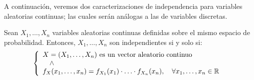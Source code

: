 A continuación, veremos dos caracterizaciones de independencia para variables aleatorias continuas; las cuales serán análogas a las de variables discretas.
\begin{prop}
    Sean $X_1, \ldots, X_n$ variables aleatorias continuas definidas sobre el mismo espacio de probabilidad. Entonces, $X_1, \ldots, X_n$ son independientes si y solo si:
    \[
        \left\{
            \begin{array}{l}
                X=(X_1, \ldots, X_n) \text{ es un vector aleatorio continuo} \\
                \quad \land \\
                f_X(x_1, \ldots, x_n) = f_{X_1}(x_1) \cdot \ldots \cdot f_{X_n}(x_n), \quad \forall x_1, \ldots, x_n \in \mathbb{R}
            \end{array}
        \right.
    \]
\end{prop}
